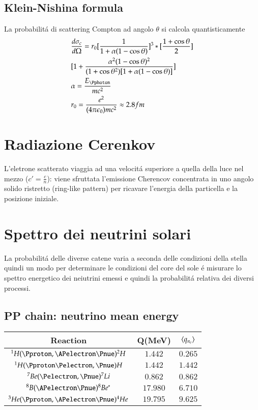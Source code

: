 \documentclass[main.tex]{subfiles}
\begin{document}
\subsection{Klein-Nishina formula}

La probabilit\'a di scattering Compton ad angolo $\theta$ si calcola quantisticamente
\begin{align*}
&\frac{d\sigma_c}{d\Omega}=r_0[\frac{1}{1+\alpha(1-\cos{\theta})}]^3*[\frac{1+\cos{\theta}}{2}]\\
&[1+\frac{\alpha^2(1-\cos{\theta})^2}{(1+\cos{\theta}^2)[1+\alpha(1-\cos{\theta})]}]\\
&\alpha=\frac{E_{\Pphoton}}{mc^2}\\
&r_0=\frac{e^2}{(4\pi\epsilon_0)mc^2}\approx2.8 fm
\end{align*}

\section{Radiazione Cerenkov}

L'eletrone scatterato viaggia ad una velocit\'a superiore a quella della luce nel mezzo ($c'=\frac{c}{n}$): viene sfruttata l'emissione Cherencov concentrata in uno angolo solido ristretto (ring-like pattern) per ricavare l'energia della particella e la posizione iniziale.  

\section{Spettro dei neutrini solari}

La probabilit\'a delle diverse catene varia a seconda delle condizioni della stella quindi un modo per determinare le condizioni del core del sole \'e misurare lo spettro energetico dei neiutrini emessi e quindi la probabilit\'a relativa dei diversi processi.


\subsection{PP chain: neutrino mean energy}

\begin{tabular}{c|cc|}
\hline
Reaction & Q(MeV) & $\langle q_{n_e} \rangle$  \\
 \hline
$^1H(\Pproton,\APelectron\Pnue)^2H$ & $1.442$ & $0.265$\\
$^1H(\Pproton\Pelectron,\Pnue)H$ & $1.442$ & $1.442$\\ 
$^7Be(\Pelectron,\Pnue)^7Li$ & $0.862$ & $0.862$\\ 
$^8B(\APelectron\Pnue)^8Be^*$ & $17.980$ & $6.710$\\
$^3He(\Pproton,\APelectron\Pnue)^4He$ & $19.795$ & $9.625$\\ 
\hline
\end{tabular}
\end{document}

